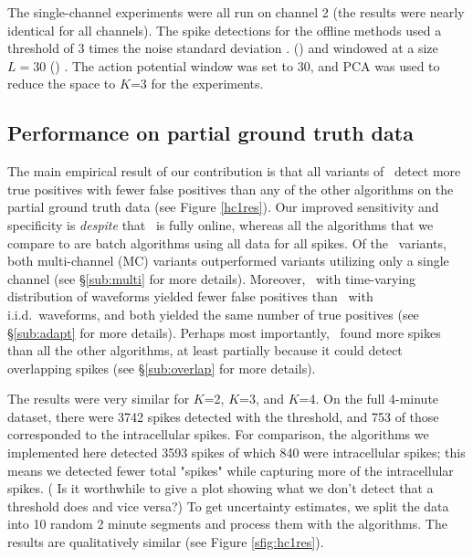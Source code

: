 % 
% 
The single-channel experiments were all run on channel 2 (the results were nearly identical for all channels).  The spike detections for the offline methods used a threshold of 3 times the noise standard deviation \cite{Lewicki}. () and windowed at a size $L=30$ () .  The action potential window was set to 30, and PCA was used to reduce the space to $K$=3 for the experiments. 



\subsection{Performance on partial ground truth data}

  The main empirical result of our contribution is that all variants of \smug~detect more true positives with fewer false positives
than any of the other algorithms on the partial ground truth data (see Figure \ref{hc1res}).  
Our improved sensitivity and specificity is \emph{despite} that \smug~is fully online, whereas all the algorithms that we compare to are batch algorithms using all data for all spikes.  Of the \smug~variants, both multi-channel (MC) variants outperformed variants utilizing only a single channel (see \S \ref{sub:multi} for more details).  Moreover, \smug~with time-varying distribution of waveforms yielded fewer false positives than \smug~with i.i.d.~waveforms, and both yielded the same number of true positives (see \S \ref{sub:adapt} for more details).  Perhaps most importantly, \smug~found more spikes than all the other algorithms, at least partially because it could detect overlapping spikes (see \S \ref{sub:overlap} for more details).


The results were very similar for $K$=2, $K$=3, and $K$=4.   On the full 4-minute dataset, there were 3742 spikes detected with the threshold, and 753 of those corresponded to the intracellular spikes.  
For comparison, the algorithms we implemented here detected 3593 spikes of which 840 were intracellular spikes; this means we detected fewer total "spikes" while capturing more of the intracellular spikes. ({\color{red}  Is it worthwhile to give a plot showing what we don't detect that a threshold does and vice versa?})
To get uncertainty estimates, we split the data into 10 random 2 minute segments and process them with the algorithms. The results are qualitatively similar (see Figure \ref{sfig:hc1res}).



